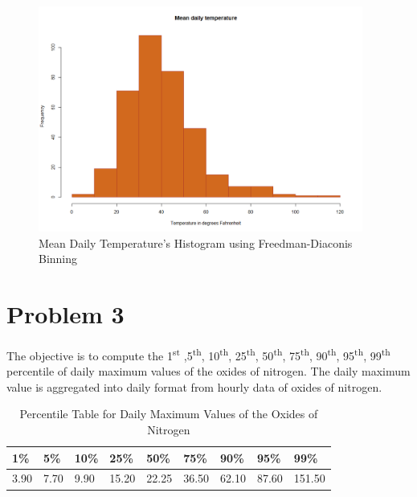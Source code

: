 \documentclass{article}%
\begin{document}
\begin{figure} [H]
	\begin{center}
	\includegraphics[width=0.95\textwidth]{Q2}
	\caption{\footnotesize Mean Daily Temperature's Histogram using Freedman-Diaconis Binning}
	\end{center}
\end{figure}


\section *{Problem 3}
The objective is to compute the 1\textsuperscript{st} ,5\textsuperscript{th}, 10\textsuperscript{th}, 25\textsuperscript{th}, 50\textsuperscript{th}, 75\textsuperscript{th}, 90\textsuperscript{th}, 95\textsuperscript{th}, 99\textsuperscript{th} percentile of daily maximum values of the oxides of nitrogen. The daily maximum value is aggregated into daily format from hourly data of oxides of nitrogen.

\begin{table}[H]
	\begin{center}
		\begin{tabular}{lllllllll}
\hline
\multicolumn{1}{|l|}{1\%}  & \multicolumn{1}{l|}{5\%}  & \multicolumn{1}{l|}{10\%} & \multicolumn{1}{l|}{25\%}  & \multicolumn{1}{l|}{50\%}  & \multicolumn{1}{l|}{75\%}  & \multicolumn{1}{l|}{90\%}  & \multicolumn{1}{l|}{95\%}  & \multicolumn{1}{l|}{99\%}   \\ \hline
\multicolumn{1}{|l|}{3.90} & \multicolumn{1}{l|}{7.70} & \multicolumn{1}{l|}{9.90} & \multicolumn{1}{l|}{15.20} & \multicolumn{1}{l|}{22.25} & \multicolumn{1}{l|}{36.50} & \multicolumn{1}{l|}{62.10} & \multicolumn{1}{l|}{87.60} & \multicolumn{1}{l|}{151.50} \\ \hline
		\end{tabular}
	\caption{\footnotesize Percentile Table for Daily Maximum Values of the Oxides of Nitrogen}	
	\end{center}
\end{table}
\end{document}

